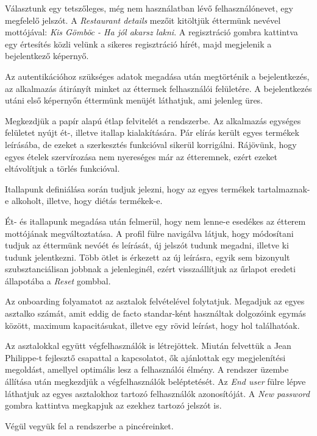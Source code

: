 
Választunk egy tetszőleges, még nem használatban lévő felhasználónevet, egy megfelelő jelszót. A \emph{Restaurant details} mezőit kitöltjük éttermünk nevével mottójával: \emph{Kis Gömböc - Ha jól akarsz lakni}. A regisztráció gombra kattintva egy értesítés közli velünk a sikeres regisztráció hírét, majd megjelenik a bejelentkező képernyő.


Az autentikációhoz szükséges adatok megadása után megtörténik a bejelentkezés, az alkalmazás átirányít minket az éttermek felhasználói felületére. A bejelentkezés utáni első képernyőn éttermünk menüjét láthatjuk, ami jelenleg üres.


Megkezdjük a papír alapú étlap felvitelét a rendszerbe. Az alkalmazás egységes felületet nyújt ét-, illetve itallap kialakítására. Pár elírás került egyes termékek leírásába, de ezeket a szerkesztés funkcióval sikerül korrigálni. Rájövünk, hogy egyes ételek szervírozása nem nyereséges már az étteremnek, ezért ezeket eltávolítjuk a törlés funkcióval.


Itallapunk definiálása során tudjuk jelezni, hogy az egyes termékek tartalmaznak-e alkoholt, illetve, hogy diétás termékek-e.


Ét- és itallapunk megadása után felmerül, hogy nem lenne-e esedékes az étterem mottójának megváltoztatása. A profil fülre navigálva látjuk, hogy módosítani tudjuk az éttermünk nevóét és leírását, új jelszót tudunk megadni, illetve ki tudunk jelentkezni. Több ötlet is érkezett az új leírásra, egyik sem bizonyult szubsztanciálisan jobbnak a jelenleginél, ezért visszaállítjuk az űrlapot eredeti állapotába a \emph{Reset} gombbal.


Az onboarding folyamatot az asztalok felvételével folytatjuk. Megadjuk az egyes asztalko számát, amit eddig de facto standar-ként használtak dolgozóink egymás között, maximum kapacitásukat, illetve egy rövid leírást, hogy hol találhatóak.


Az asztalokkal együtt végfelhasználók is létrejöttek. Miután felvettük a Jean Philippe-t fejlesztő csapattal a kapcsolatot, ők ajánlottak egy megjelenítési megoldást, amellyel optimális lesz a felhasználói élmény. A rendszer üzembe állítása után megkezdjük a végfelhasználók beléptetését. Az \emph{End user} fülre lépve láthatjuk az egyes asztalokhoz tartozó felhasználók azonosítóját. A \emph{New password} gombra kattintva megkapjuk az ezekhez tartozó jelszót is.


Végül vegyük fel a rendszerbe a pincéreinket.

